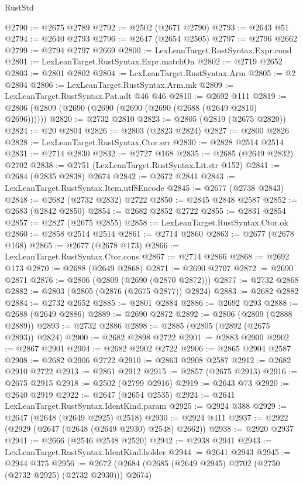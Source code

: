 \begin{lexlean}{RustStd}
\begin{coremodule}
@2790 := @2675 @2789
@2792 := @2502 (@2671 @2790)
@2793 := @2643 @51
@2794 := @2640 @2793
@2796 := @2647 (@2654 @2505)
@2797 := @2796 @2662
@2799 := @2794 @2797 @2669
@2800 := LexLeanTarget.RustSyntax.Expr.cond
@2801 := LexLeanTarget.RustSyntax.Expr.matchOn
@2802 := @2719 @2652
@2803 := @2801 @2802
@2804 := LexLeanTarget.RustSyntax.Arm
@2805 := @2 @2804
@2806 := LexLeanTarget.RustSyntax.Arm.mk
@2809 := LexLeanTarget.RustSyntax.Pat.adt @46 @46
@2810 := @2692 @111
@2819 := @2806 (@2809 (@2690 (@2690 (@2690 (@2690 (@2688 (@2649 @2810) @2696))))))
@2820 := @2732 @2810
@2823 := @2805 (@2819 (@2675 @2820))
@2824 := @20 @2804
@2826 := @2803 (@2823 @2824)
@2827 := @2800 @2826
@2828 := LexLeanTarget.RustSyntax.Ctor.err
@2830 := @2828 @2514 @2514
@2831 := @2714 @2830
@2832 := @2727 @168
@2835 := @2685 (@2649 @2832) @2702
@2838 := @2751 (LexLeanTarget.RustSyntax.Lit.str @152)
@2841 := @2684 (@2835 @2838) @2674
@2842 := @2672 @2841
@2843 := LexLeanTarget.RustSyntax.Item.utf8Encode
@2845 := @2677 (@2738 @2843)
@2848 := @2682 (@2732 @2832) @2722
@2850 := @2845 @2848 @2587
@2852 := @2683 (@2842 @2850)
@2854 := @2682 @2852 @2722
@2855 := @2831 @2854
@2857 := @2827 (@2675 @2855)
@2858 := LexLeanTarget.RustSyntax.Ctor.ok
@2860 := @2858 @2514 @2514
@2861 := @2714 @2860
@2863 := @2677 (@2678 @168)
@2865 := @2677 (@2678 @173)
@2866 := LexLeanTarget.RustSyntax.Ctor.cons
@2867 := @2714 @2866
@2868 := @2692 @173
@2870 := @2688 (@2649 @2868)
@2871 := @2690 @2707
@2872 := @2690 @2871
@2876 := @2806 (@2809 (@2690 (@2870 @2872)))
@2877 := @2732 @2868
@2882 := @2803 (@2805 (@2876 (@2675 @2877)) @2824)
@2883 := @2682 @2882
@2884 := @2732 @2652
@2885 := @2801 @2884
@2886 := @2692 @293
@2888 := @2688 (@2649 @2886)
@2889 := @2690 @2872
@2892 := @2806 (@2809 (@2888 @2889))
@2893 := @2732 @2886
@2898 := @2885 (@2805 (@2892 (@2675 @2893)) @2824)
@2900 := @2682 @2898 @2722
@2901 := @2883 @2900
@2902 := @2867 @2901
@2904 := @2682 @2902 @2722
@2906 := @2865 @2904 @2587
@2908 := @2682 @2906 @2722
@2910 := @2863 @2908 @2587
@2912 := @2682 @2910 @2722
@2913 := @2861 @2912
@2915 := @2857 (@2675 @2913)
@2916 := @2675 @2915
@2918 := @2502 (@2799 @2916)
@2919 := @2643 @73
@2920 := @2640 @2919
@2922 := @2647 (@2654 @2535)
@2924 := @2641 LexLeanTarget.RustSyntax.IdentKind.param
@2925 := @2924 @388
@2929 := @2647 (@2648 (@2649 @2925) @2518)
@2930 := @2924 @411
@2937 := @2922 (@2929 (@2647 (@2648 (@2649 @2930) @2548) @2662))
@2938 := @2920 @2937
@2941 := @2666 (@2546 @2548 @2520)
@2942 := @2938 @2941
@2943 := LexLeanTarget.RustSyntax.IdentKind.holder
@2944 := @2641 @2943
@2945 := @2944 @375
@2956 := @2672 (@2684 (@2685 (@2649 @2945) @2702 (@2750 (@2732 @2925) (@2732 @2930))) @2674)

\end{coremodule}
\end{lexlean}
